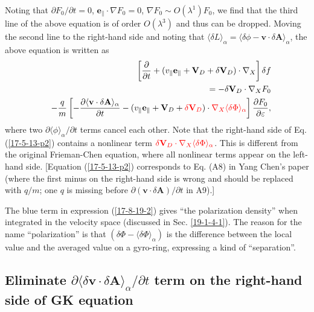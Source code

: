 \documentclass{article}
\newcommand{\tmcolor}[2]{{\color{#1}{#2}}}
\begin{document}
Noting that $\partial F_0 / \partial t = 0$, $\mathbf{e}_{\parallel} \cdot
\nabla F_0 = 0$, $\nabla F_0 \sim O (\lambda^1) F_0$, we find that the third
line of the above equation is of order $O (\lambda^3)$ and thus can be
dropped. Moving the second line to the right-hand side and noting that
$\langle \delta L \rangle_{\alpha} = \langle \delta \phi -\mathbf{v} \cdot
\delta \mathbf{A} \rangle_{\alpha}$, the above equation is written as
\begin{eqnarray}
  &  & \left[ \frac{\partial}{\partial t} + (v_{\parallel}
  \mathbf{e}_{\parallel} +\mathbf{V}_D + \delta \mathbf{V}_D) \cdot \nabla_X
  \right] \delta f \nonumber\\
  &  & = - \delta \mathbf{V}_D \cdot \nabla_X F_0 \nonumber\\
  &  & - \frac{q}{m} \left[ - \frac{\partial \langle \mathbf{v} \cdot \delta
  \mathbf{A} \rangle_{\alpha}}{\partial t} - (v_{\parallel}
  \mathbf{e}_{\parallel} +\mathbf{V}_D + \tmcolor{red}{\delta \mathbf{V}_D})
  \cdot \tmcolor{red}{\nabla_X \langle \delta \Phi \rangle_{\alpha}} \right]
  \frac{\partial F_0}{\partial \varepsilon},  \label{17-5-13-p2}
\end{eqnarray}
where two $\partial \langle \phi \rangle_{\alpha} / \partial t$ terms cancel
each other. Note that the right-hand side of Eq. (\ref{17-5-13-p2}) contains a
nonlinear term $\tmcolor{red}{\delta \mathbf{V}_D \cdot \nabla_X \langle
\delta \Phi \rangle_{\alpha}}$. This is different from the original
Frieman-Chen equation, where all nonlinear terms appear on the left-hand side.
[Equation (\ref{17-5-13-p2}) corresponds to Eq. (A8) in Yang Chen's
paper{\cite{ychen2009}} (where the first minus on the right-hand side is wrong
and should be replaced with $q / m$; one $q$ is missing before $\partial
(\mathbf{v} \cdot \delta \mathbf{A}) / \partial t$ in A9).]

The blue term in expression (\ref{17-8-19-2}) gives ``the polarization
density'' when integrated in the velocity space (discussed in Sec.
\ref{19-1-4-1}). The reason for the name ``polarization'' is that $(\delta
\Phi - \langle \delta \Phi \rangle_{\alpha})$ is the difference between the
local value and the averaged value on a gyro-ring, expressing a kind of
``separation''.

\subsection{Eliminate $\partial \langle \delta \mathbf{v} \cdot \delta
\mathbf{A} \rangle_{\alpha} / \partial t$ term on the right-hand side of GK
equation}
\end{document}
